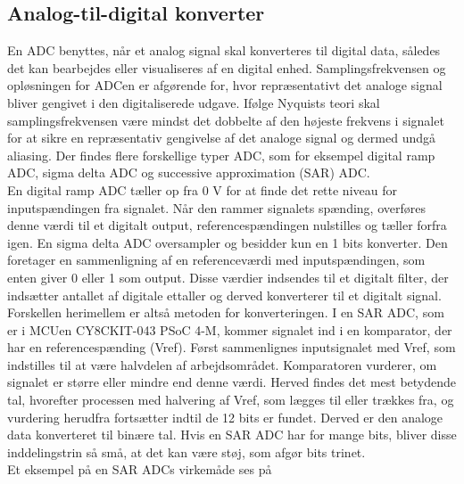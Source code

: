 \subsection{Analog-til-digital konverter}
En ADC benyttes, når et analog signal skal konverteres til digital data, således det kan bearbejdes eller visualiseres af en digital enhed. Samplingsfrekvensen og opløsningen for ADCen er afgørende for, hvor repræsentativt det analoge signal bliver gengivet i den digitaliserede udgave. Ifølge Nyquists teori skal samplingsfrekvensen være mindst det dobbelte af den højeste frekvens i signalet for at sikre en repræsentativ gengivelse af det analoge signal og dermed undgå aliasing. Der findes flere forskellige typer ADC, som for eksempel digital ramp ADC, sigma delta ADC og successive approximation (SAR) ADC.\\ 
En digital ramp ADC tæller op fra 0 V for at finde det rette niveau for inputspændingen fra signalet. Når den rammer signalets spænding, overføres denne værdi til et digitalt output, referencespændingen nulstilles og tæller forfra igen. En sigma delta ADC oversampler og besidder kun en 1 bits konverter. Den foretager en sammenligning af en referenceværdi med inputspændingen, som enten giver 0 eller 1 som output. Disse værdier indsendes til et digitalt filter, der indsætter antallet af digitale ettaller og derved konverterer til et digitalt signal. Forskellen herimellem er altså metoden for konverteringen. I en SAR ADC, som er i MCUen CY8CKIT-043 PSoC 4-M, kommer signalet ind i en komparator, der har en referencespænding (Vref). Først sammenlignes inputsignalet med Vref, som indstilles til at være halvdelen af arbejdsområdet. Komparatoren vurderer, om signalet er større eller mindre end denne værdi. Herved findes det mest betydende tal, hvorefter processen med halvering af Vref, som lægges til eller trækkes fra, og vurdering herudfra fortsætter indtil de 12 bits er fundet. Derved er den analoge data konverteret til binære tal. Hvis en SAR ADC har for mange bits, bliver disse inddelingstrin så små, at det kan være støj, som afgør bits trinet. \citep{Moore2004,Sheingold2014} \\
Et eksempel på en SAR ADCs virkemåde ses på 
